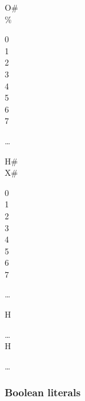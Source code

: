 \begin{syntax}[\miscextcolour]
  \begin{1=}
    O\# \\
    \%
  \end{1=}
  \begin{1=}
    0 \\
    1 \\
    2 \\
    3 \\
    4 \\
    5 \\
    6 \\
    7
  \end{1=}\ldots
\end{syntax}

\begin{syntax}[\miscextcolour]
  \begin{1=}
    H\# \\
    X\#
  \end{1=}
  \begin{1=}
    0 \\
    1 \\
    2 \\
    3 \\
    4 \\
    5 \\
    6 \\
    7
  \end{1=}\ldots
\end{syntax}

\begin{syntax}[\gnucobolcolour] %
  \begin{1=}
    H\textquotesingle
    \begin{0-1}
      \character
    \end{0-1}\ldots
    \textquotesingle \\
    
    H\textquotedbl
    \begin{0-1}
      \character
    \end{0-1}\ldots
    \textquotedbl
  \end{1=}
\end{syntax}

\subsubsection{Boolean literals}

